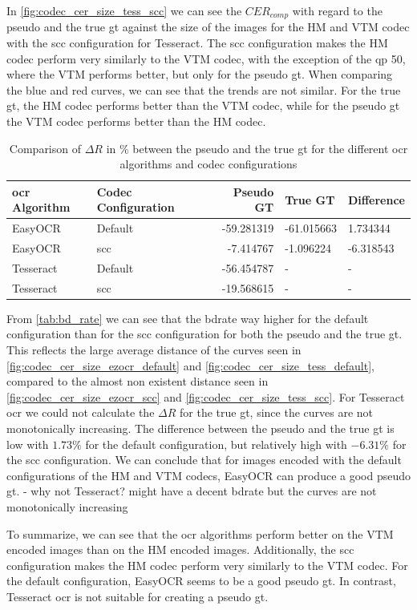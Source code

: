 In \autoref{fig:codec_cer_size_tess_scc} we can see the $CER_{comp}$ with regard to the pseudo and the true \gls{gt} against the size of the images for the HM and VTM codec with the \gls{scc} configuration for Tesseract.
The \gls{scc} configuration makes the HM codec perform very similarly to the VTM codec, with the exception of the \gls{qp} 50, where the VTM performs better, but only for the pseudo \gls{gt}.
When comparing the blue and red curves, we can see that the trends are not similar.
For the true \gls{gt}, the HM codec performs better than the VTM codec, while for the pseudo \gls{gt} the VTM codec performs better than the HM codec.

\begin{table}
    \centering
    \begin{tabular}{|ll|rl|l|}
        \hline
        \gls{ocr} Algorithm & Codec Configuration & Pseudo GT & True GT & Difference \\
        \hline
        \hline
        EasyOCR & Default & -59.281319 & -61.015663 & 1.734344 \\
        EasyOCR & \gls{scc} & -7.414767 & -1.096224 & -6.318543 \\
        \hline
        Tesseract & Default & -56.454787 & - & - \\
        Tesseract & \gls{scc} & -19.568615 & - & - \\
        \hline
    \end{tabular}
    \caption{Comparison of $\Delta R$ in \% between the pseudo and the true \gls{gt} for the different \gls{ocr} algorithms and codec configurations}
    \label{tab:bd_rate}
\end{table}

From \autoref{tab:bd_rate} we can see that the \gls{bdrate} way higher for the default configuration than for the \gls{scc} configuration for both the pseudo and the true \gls{gt}.
This reflects the large average distance of the curves seen in \autoref{fig:codec_cer_size_ezocr_default} and \autoref{fig:codec_cer_size_tess_default}, compared to the almost non existent distance seen in \autoref{fig:codec_cer_size_ezocr_scc} and \autoref{fig:codec_cer_size_tess_scc}.
For Tesseract \gls{ocr} we could not calculate the $\Delta R$ for the true \gls{gt}, since the curves are not monotonically increasing.
The difference between the pseudo and the true \gls{gt} is low with $1.73\%$ for the default configuration, but relatively high with $-6.31\%$ for the \gls{scc} configuration.
We can conclude that for images encoded with the default configurations of the HM and VTM codecs, EasyOCR can produce a good pseudo \gls{gt}.
- why not Tesseract? might have a decent bdrate but the curves are not monotonically increasing

To summarize, we can see that the \gls{ocr} algorithms perform better on the VTM encoded images than on the HM encoded images.
Additionally, the \gls{scc} configuration makes the HM codec perform very similarly to the VTM codec.
For the default configuration, EasyOCR seems to be a good pseudo \gls{gt}.
In contrast, Tesseract \gls{ocr} is not suitable for creating a pseudo \gls{gt}.
